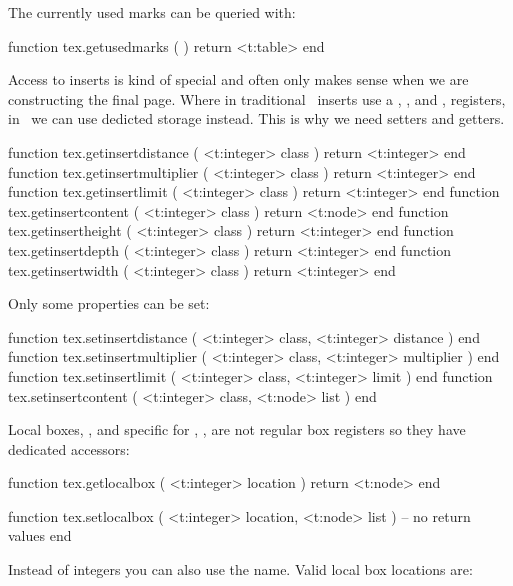 The currently used marks can be queried with:

\starttyping[option=LUA]
function tex.getusedmarks ( )
    return <t:table>
end
\stoptyping

\stopsubsection

\startsubsection[title=Inserts]

Access to inserts is kind of special and often only makes sense when we are
constructing the final page. Where in traditional \TEX\ inserts use a \type
{\dimen}, \type {\count}, \type {\skip} and \type {\box}, registers, in
\LUAMETATEX\ we can use dedicted storage instead. This is why we need setters and
getters.

\starttyping[option=LUA]
function tex.getinsertdistance   ( <t:integer> class ) return <t:integer> end
function tex.getinsertmultiplier ( <t:integer> class ) return <t:integer> end
function tex.getinsertlimit      ( <t:integer> class ) return <t:integer> end
function tex.getinsertcontent    ( <t:integer> class ) return <t:node>    end
function tex.getinsertheight     ( <t:integer> class ) return <t:integer> end
function tex.getinsertdepth      ( <t:integer> class ) return <t:integer> end
function tex.getinsertwidth      ( <t:integer> class ) return <t:integer> end
\stoptyping

Only some properties can be set:

\starttyping[option=LUA]
function tex.setinsertdistance   ( <t:integer> class, <t:integer> distance   ) end
function tex.setinsertmultiplier ( <t:integer> class, <t:integer> multiplier ) end
function tex.setinsertlimit      ( <t:integer> class, <t:integer> limit      ) end
function tex.setinsertcontent    ( <t:integer> class, <t:node>    list       ) end
\stoptyping

\stopsubsection

\startsubsection[title=Local boxes]

Local boxes, \typ {\localleftbox}, \typ {\localrightbox} and specific for
\LUAMETATEX, \typ {\localmiddlebox}, are not regular box registers so they have
dedicated accessors:

\starttyping[option=LUA]
function tex.getlocalbox ( <t:integer> location )
    return <t:node>
end

function tex.setlocalbox ( <t:integer> location, <t:node> list )
    -- no return values
end
\stoptyping

Instead of integers you can also use the name. Valid local box locations are:


